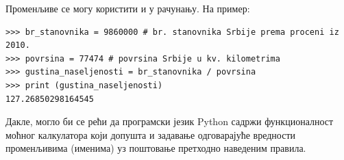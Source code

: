 Променљиве се могу користити и у рачунању. На пример:

\begin{lstlisting}[caption = Пример коришћења променљивих, label = variables]
>>> br_stanovnika = 9860000 # br. stanovnika Srbije prema proceni iz 2010.
>>> povrsina = 77474 # povrsina Srbije u kv. kilometrima
>>> gustina_naseljenosti = br_stanovnika / povrsina
>>> print (gustina_naseljenosti)
127.26850298164545
\end{lstlisting}

Дакле, могло би се рећи да програмски језик Python садржи функционалност моћног калкулатора који допушта и задавање одговарајуће вредности променљивима (именима) уз поштовање претходно наведеним правила.
